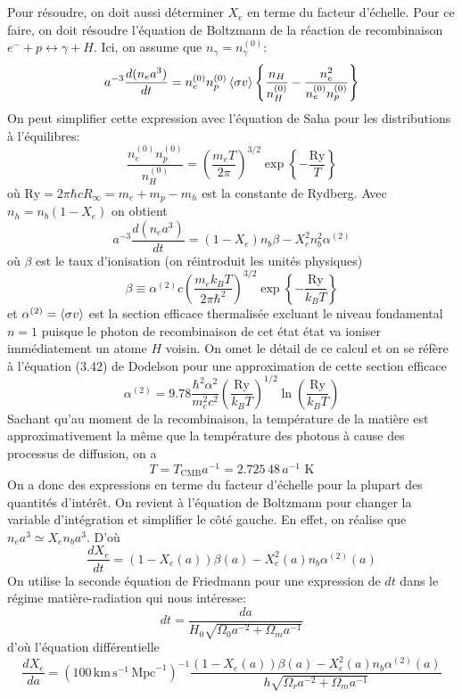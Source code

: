 \documentclass{article}
\numberwithin{equation}{section}
\begin{document}
\section{}
Pour résoudre, on doit aussi déterminer $X_e$ en terme du facteur 
d'échelle. Pour ce faire, on doit résoudre l'équation de Boltzmann 
de la réaction de recombinaison $e^{-} + p \longleftrightarrow \gamma + H$. 
Ici, on assume que $n_\gamma = n_\gamma^{(0)}$:
\begin{equation}\label{eq:Boltzmannrecombinaison} 
		a^{-3} \frac{d(n_e a^3)}{dt} = n_e^{(0)}n_p^{(0)} \expval{\sigma v}
		\left\{ \frac{n_H}{n_{H}^{(0)}}  - \frac{n_e^2}{n_e^{(0)} n_p^{(0)}}\right\}
\end{equation} 
On peut simplifier cette expression avec l'équation de Saha 
pour les distributions à l'équilibres:
\[
		\frac{n_e^{(0)} n_p^{(0)}}{n_H^{(0)}} 
		= \left( \frac{m_e T}{2 \pi} \right)^{3/2}
		\exp \left\{ -\frac{\text{Ry}}{T} \right\} 
\]
où $\text{Ry} = 2 \pi \hbar c R_{\infty } = m_e + m_p - m_h$ 
est la constante de Rydberg. Avec $n_h = n_b(1 - X_e)$ on 
obtient
\[
		a^{-3} \frac{d(n_e a^3)}{dt} =  (1 - X_e)n_b\beta  - X_e^2n_b^2\alpha^{(2)}
\]
où $\beta$ est le taux d'ionisation (on réintroduit les unités physiques)
\[
		\beta \equiv 
		\alpha^{(2)} c\left( \frac{m_e k_B T}{2 \pi \hbar^{2}} \right)^{3/2}
		\exp \left\{ -\frac{\text{Ry}}{k_B T} \right\}
\]
et $\alpha^{(2)} = \expval{\sigma v}$ est la section efficace thermalisée 
excluant 
le niveau fondamental $n = 1$ puisque le photon de recombinaison
de cet état état va ioniser immédiatement un atome $H$ voisin. 
On omet le détail de ce calcul et on se réfère à l'équation (3.42)
de Dodelson pour une approximation de cette section efficace
\[
		\alpha^{(2)} = 9.78 \frac{\hbar^2\alpha^{2}}{m_e^2c^2} 
		\left( \frac{\text{Ry}}{k_BT}  \right)^{1/2}
		\ln \left( \frac{\text{Ry}}{k_BT} \right)
\]
Sachant qu'au moment de la recombinaison, la température de la 
matière est approximativement la même que la température des 
photons à cause des processus de diffusion, on a
\[
		T = T_{\text{CMB}}a^{-1} = 2.725\,48\, a^{-1}\,\,\text{K}
\]
On a donc des expressions en terme du facteur d'échelle pour 
la plupart des quantités d'intérêt. On revient à l'équation de 
Boltzmann pour changer la variable d'intégration et simplifier le 
côté gauche. En effet, on réalise que $n_e a^3 \simeq X_e n_b a^3$. 
D'où
\[
		\frac{dX_e}{dt} =  (1 - X_e(a))\beta(a)  - X_e^2(a)n_b\alpha^{(2)}(a)
\]
On utilise la seconde équation de Friedmann pour une expression 
de $dt$ dans le régime matière-radiation qui nous intéresse:
\[
		dt = \frac{da}{H_0 \sqrt{\Omega_0 a^{-2} + \Omega_m a^{-1}}}
\]
d'où l'équation différentielle
\[
		\frac{dX_e}{da} = (100\, \text{km}\,\text{s}^{-1}\, \text{Mpc}^{-1})^{-1}
		\frac{ (1 - X_e(a))\beta(a)  - X_e^2(a)n_b\alpha^{(2)}(a)}{
		h\sqrt{\Omega_r a^{-2} + \Omega_m a^{-1}}}
\]
\end{document}
